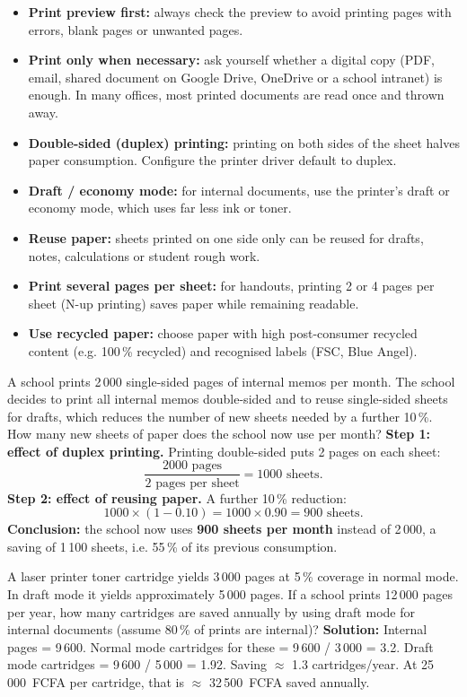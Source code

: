 \documentclass[11pt]{article}
\begin{document}
\begin{itemize}
\item \textbf{Print preview first:} always check the preview to avoid printing pages with errors, blank pages or unwanted pages.
\item \textbf{Print only when necessary:} ask yourself whether a digital copy (PDF, email, shared document on Google Drive, OneDrive or a school intranet) is enough. In many offices, most printed documents are read once and thrown away.
\item \textbf{Double-sided (duplex) printing:} printing on both sides of the sheet halves paper consumption. Configure the printer driver default to duplex.
\item \textbf{Draft / economy mode:} for internal documents, use the printer's draft or economy mode, which uses far less ink or toner.
\item \textbf{Reuse paper:} sheets printed on one side only can be reused for drafts, notes, calculations or student rough work.
\item \textbf{Print several pages per sheet:} for handouts, printing 2 or 4 pages per sheet (N-up printing) saves paper while remaining readable.
\item \textbf{Use recycled paper:} choose paper with high post-consumer recycled content (e.g. 100\,\% recycled) and recognised labels (FSC, Blue Angel).
\end{itemize}

\begin{exoresolu}
A school prints 2\,000 single-sided pages of internal memos per month. The school decides to print all internal memos double-sided and to reuse single-sided sheets for drafts, which reduces the number of new sheets needed by a further 10\,\%. How many new sheets of paper does the school now use per month?
\tcblower
\textbf{Step 1: effect of duplex printing.} Printing double-sided puts 2 pages on each sheet:
\[ \frac{2000 \text{ pages}}{2 \text{ pages per sheet}} = 1000 \text{ sheets}. \]
\textbf{Step 2: effect of reusing paper.} A further 10\,\% reduction:
\[ 1000 \times (1 - 0.10) = 1000 \times 0.90 = 900 \text{ sheets}. \]
\textbf{Conclusion:} the school now uses \textbf{900 sheets per month} instead of 2\,000, a saving of 1\,100 sheets, i.e. 55\,\% of its previous consumption.
\end{exoresolu}

\begin{exemplebox}
A laser printer toner cartridge yields 3\,000 pages at 5\,\% coverage in normal mode. In draft mode it yields approximately 5\,000 pages. If a school prints 12\,000 pages per year, how many cartridges are saved annually by using draft mode for internal documents (assume 80\,\% of prints are internal)?
\textbf{Solution:} Internal pages = 9\,600. Normal mode cartridges for these = 9\,600 / 3\,000 = 3.2. Draft mode cartridges = 9\,600 / 5\,000 = 1.92. Saving $\approx$ 1.3 cartridges/year. At 25\,000~FCFA per cartridge, that is $\approx$ 32\,500~FCFA saved annually.
\end{exemplebox}
\end{document}

